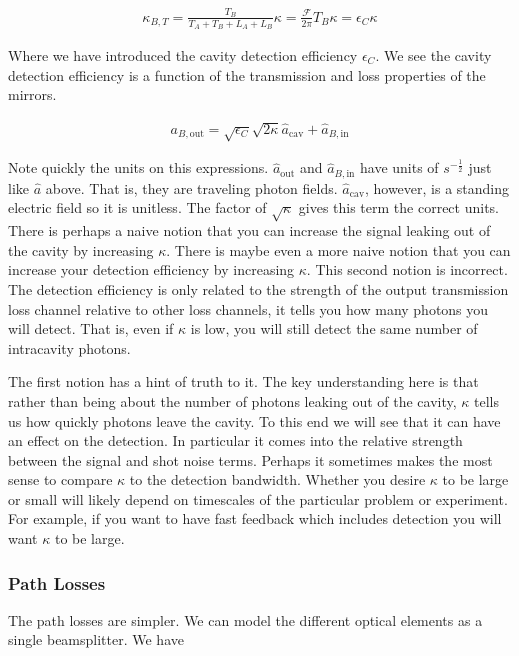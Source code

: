 \documentclass[12pt]{article}
\newcommand{\ep}{\epsilon}
\begin{document}
\begin{align}
\kappa_{B,T} = \frac{T_B}{T_A + T_B + L_A + L_B} \kappa = \frac{\mathcal{F}}{2\pi} T_B \kappa = \ep_C \kappa
\end{align}

Where we have introduced the cavity detection efficiency $\ep_C$. We see the cavity detection efficiency is a function of the transmission and loss properties of the mirrors.

\begin{align}
a_{B,\text{out}} = \sqrt{\ep_C}\sqrt{2\kappa} \hat{a}_{\text{cav}} + \hat{a}_{B,\text{in}}
\end{align}

Note quickly the units on this expressions. $\hat{a}_{\text{out}}$ and $\hat{a}_{B,\text{in}}$ have units of $s^{-\frac{1}{2}}$ just like $\hat{a}$ above. That is, they are traveling photon fields. $\hat{a}_{\text{cav}}$, however, is a standing electric field so it is unitless. The factor of $\sqrt{\kappa}$ gives this term the correct units. 
There is perhaps a naive notion that you can increase the signal leaking out of the cavity by increasing $\kappa$. There is maybe even a more naive notion that you can increase your detection efficiency by increasing $\kappa$. This second notion is incorrect. The detection efficiency is only related to the strength of the output transmission loss channel relative to other loss channels, it tells you how many photons you will detect. That is, even if $\kappa$ is low, you will still detect the same number of intracavity photons. 

The first notion has a hint of truth to it. The key understanding here is that rather than being about the number of photons leaking out of the cavity, $\kappa$ tells us how quickly photons leave the cavity. To this end we will see that it can have an effect on the detection. In particular it comes into the relative strength between the signal and shot noise terms. Perhaps it sometimes makes the most sense to compare $\kappa$ to the detection bandwidth. Whether you desire $\kappa$ to be large or small will likely depend on timescales of the particular problem or experiment. For example, if you want to have fast feedback which includes detection you will want $\kappa$ to be large.

\subsubsection{Path Losses}

The path losses are simpler. We can model the different optical elements as a single beamsplitter. We have
\end{document}
